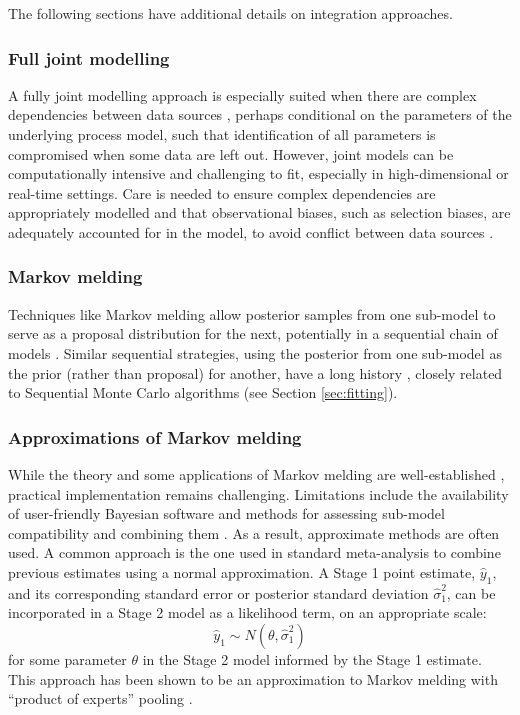 \documentclass{article}
\begin{document}
The following sections have additional details on integration approaches.

\subsubsection{Full joint modelling}\label{sec:joint}

A fully joint modelling approach is especially suited when there are complex dependencies between data sources \citep{corbella2022inferring}, perhaps conditional on the parameters of the underlying process model, such that identification of all parameters is compromised when some data are left out. However, joint models can be computationally intensive and challenging to fit, especially in high-dimensional or real-time settings. Care is needed to ensure complex dependencies are appropriately modelled and that observational biases, such as selection biases, are adequately accounted for in the model, to avoid conflict between data sources \citep{presanis2013conflict,corbella2022inferring}. 

\subsubsection{Markov melding} Techniques like Markov melding \citep{goudie2019joining} allow posterior samples from one sub-model to serve as a proposal distribution for the next, potentially in a sequential chain of models \citep{manderson2023combining}. Similar sequential strategies, using the posterior from one sub-model as the prior (rather than proposal) for another, have a long history \citep{west1997bayesian}, closely related to Sequential Monte Carlo algorithms \citep{doucet2001introduction} (see Section \ref{sec:fitting}).

\subsubsection{Approximations of Markov melding} While the theory and some applications of Markov melding are well-established \citep{goudie2019joining,nicholson2022interoperability,manderson2023combining}, practical implementation remains challenging. Limitations include the availability of user-friendly Bayesian software and methods for assessing sub-model compatibility and combining them \citep{yang2025detecting}. As a result, approximate methods are often used. A common approach is the one used in standard meta-analysis \citep{borenstein2021introduction} to combine previous estimates using a normal approximation. A Stage 1 point estimate, $\hat{y}_1$, and its corresponding standard error or posterior standard deviation $\hat{\sigma}^2_1$, can be incorporated in a Stage 2 model as a likelihood term, on an appropriate scale:
$$
\hat{y}_1 \sim N(\theta, \hat{\sigma}^2_1)
$$ for some parameter $\theta$ in the Stage 2 model informed by the Stage 1 estimate. This approach has been shown to be an approximation to Markov melding with ``product of experts'' pooling \citep{goudie2019joining}.
\end{document}
